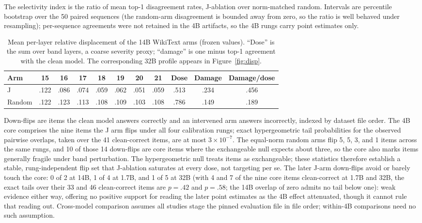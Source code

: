 \documentclass{article}
\begin{document}
The selectivity index is the ratio of mean top-1 disagreement rates, J-ablation over
norm-matched random. Intervals are percentile bootstrap over the 50 paired sequences (the
random-arm disagreement is bounded away from zero, so the ratio is well behaved under
resampling); per-sequence agreements were not retained in the 4B artifacts, so the 4B
rungs carry point estimates only.

\begin{table}[ht]
  \caption{Mean per-layer relative displacement of the 14B WikiText arms (frozen values).
  ``Dose'' is the sum over band layers, a coarse severity proxy; ``damage'' is one minus
  top-1 agreement with the clean model. The corresponding 32B profile appears in
  Figure~\ref{fig:disp}.}
  \label{tab:displacement}
  \centering
  \small
  \begin{tabular}{lcccccccccc}
    \toprule
    Arm & 15 & 16 & 17 & 18 & 19 & 20 & 21 & Dose & Damage & Damage/dose \\
    \midrule
    J      & .122 & .086 & .074 & .059 & .062 & .051 & .059 & .513 & .234 & .456 \\
    Random & .122 & .123 & .113 & .108 & .109 & .103 & .108 & .786 & .149 & .189 \\
    \bottomrule
  \end{tabular}
\end{table}

Down-flips are items the clean model answers correctly and an intervened arm answers
incorrectly, indexed by dataset file order. The 4B core comprises the nine items the J arm
flips under all four calibration rungs; exact hypergeometric tail probabilities for the
observed pairwise overlaps, taken over the 41 clean-correct items, are at most
$3\times10^{-7}$. The equal-norm random arms flip 5, 5, 3, and 1 items across the same
rungs, and 10 of those 14 down-flips are core items where the exchangeable null expects
about three, so the core also marks items generally fragile under band perturbation. The
hypergeometric null treats items as exchangeable; these statistics therefore establish a
stable, rung-independent flip set that J-ablation saturates at every dose, not targeting
per se. The later J-arm down-flips avoid or barely touch the core: 0 of 2 at 14B, 1 of 4 at
1.7B, and 1 of 5 at 32B (with 4 and 7 of the nine core items clean-correct at 1.7B and
32B, the exact tails over their 33 and 46 clean-correct items are $p=.42$ and $p=.58$;
the 14B overlap of zero admits no tail below one): weak evidence either way,
offering no positive support for reading the later point estimates as the 4B effect
attenuated, though it cannot rule that reading out. Cross-model comparison assumes all
studies stage the pinned evaluation file in file order; within-4B comparisons need no
such assumption.
\end{document}

